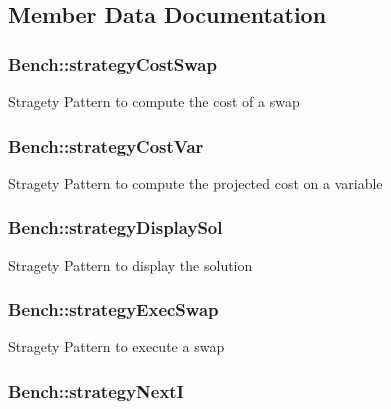 \subsection{\-Member \-Data \-Documentation}
\hypertarget{classBench_a27ed9ea3eb2b29027e79e31adf331d86}{
\subsubsection[{strategy\-Cost\-Swap}]{ {\bf \-Bench\-::strategy\-Cost\-Swap}}}\label{classBench_a27ed9ea3eb2b29027e79e31adf331d86}
\-Stragety \-Pattern to compute the cost of a swap \hypertarget{classBench_a2ce57cda8198f6be72fd0ac045b06839}{
\subsubsection[{strategy\-Cost\-Var}]{ {\bf \-Bench\-::strategy\-Cost\-Var}}}\label{classBench_a2ce57cda8198f6be72fd0ac045b06839}
\-Stragety \-Pattern to compute the projected cost on a variable \hypertarget{classBench_a31569ae22eda31c68257050276fa6fee}{
\subsubsection[{strategy\-Display\-Sol}]{ {\bf \-Bench\-::strategy\-Display\-Sol}}}\label{classBench_a31569ae22eda31c68257050276fa6fee}
\-Stragety \-Pattern to display the solution \hypertarget{classBench_a8737cee0eb80295048068322c9a20359}{
\subsubsection[{strategy\-Exec\-Swap}]{ {\bf \-Bench\-::strategy\-Exec\-Swap}}}\label{classBench_a8737cee0eb80295048068322c9a20359}
\-Stragety \-Pattern to execute a swap \hypertarget{classBench_af15b42b6084454f59cd63cf9968a2a5b}{
\subsubsection[{strategy\-Next\-I}]{ {\bf \-Bench\-::strategy\-Next\-I}}}\label{classBench_af15b42b6084454f59cd63cf9968a2a5b}
